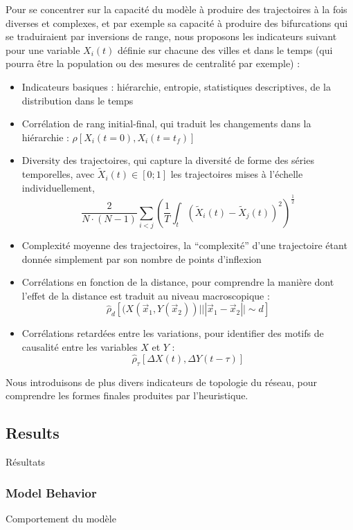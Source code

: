 Pour se concentrer sur la capacité du modèle à produire des trajectoires à la fois diverses et complexes, et par exemple sa capacité à produire des bifurcations qui se traduiraient par inversions de range, nous proposons les indicateurs suivant pour une variable $X_i(t)$ définie sur chacune des villes et dans le temps (qui pourra être la population ou des mesures de centralité par exemple) :

\begin{itemize}
  \item Indicateurs basiques : hiérarchie, entropie, statistiques descriptives, de la distribution dans le temps
  \item Corrélation de rang initial-final, qui traduit les changements dans la hiérarchie : $\rho\left[X_i(t=0),X_i(t=t_f)\right]$
  \item Diversity des trajectoires, qui capture la diversité de forme des séries temporelles, avec $\tilde{X}_i(t)\in \left[0;1\right]$ les trajectoires mises à l'échelle individuellement,
\[
\frac{2}{N\cdot(N-1)}\sum_{i<j} \left(\frac{1}{T}\int_{t} \left(\tilde{X}_i(t) - \tilde{X}_j(t)\right)^2 \right)^{\frac{1}{2}}
\]
\item Complexité moyenne des trajectoires, la ``complexité'' d'une trajectoire étant donnée simplement par son nombre de points d'inflexion
\item Corrélations en fonction de la distance, pour comprendre la manière dont l'effet de la distance est traduit au niveau macroscopique : 
\[
\hat{\rho}_d\left[(X(\vec{x}_1,Y(\vec{x}_2))|||\vec{x}_1-\vec{x}_2||\sim d\right]
\]
\item Corrélations retardées entre les variations, pour identifier des motifs de causalité entre les variables $X$ et $Y$ : \[
\hat{\rho}_{\tau}\left[\Delta X(t),\Delta Y(t-\tau)\right]
\]
\end{itemize}



Nous introduisons de plus divers indicateurs de topologie du réseau, pour comprendre les formes finales produites par l'heuristique.




\subsection{Results}{Résultats}


\subsubsection{Model Behavior}{Comportement du modèle}


